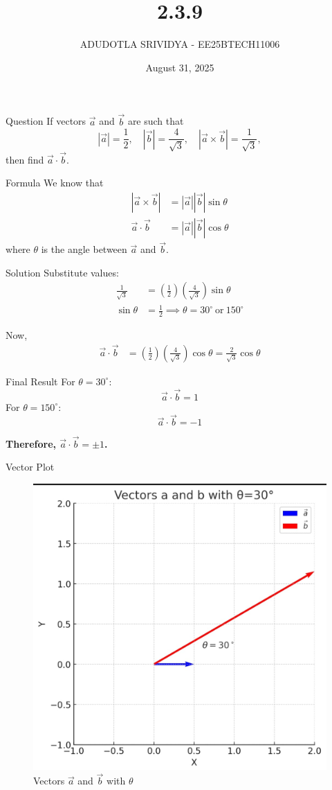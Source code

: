 \documentclass{beamer}
\title
{2.3.9}
\date{August 31, 2025}
\author 
{ADUDOTLA SRIVIDYA - EE25BTECH11006}
\begin{document}
\frame{\titlepage}


\begin{frame}{Question}
If vectors $\vec{a}$ and $\vec{b}$ are such that 
\[
|\vec{a}| = \frac{1}{2}, \quad |\vec{b}| = \frac{4}{\sqrt{3}}, \quad |\vec{a} \times \vec{b}| = \frac{1}{\sqrt{3}},
\]
then find $\vec{a} \cdot \vec{b}$.
\end{frame}


\begin{frame}{Formula}
We know that
\begin{align}
|\vec{a} \times \vec{b}| &= |\vec{a}||\vec{b}|\sin\theta \\
\vec{a} \cdot \vec{b} &= |\vec{a}||\vec{b}|\cos\theta
\end{align}
where $\theta$ is the angle between $\vec{a}$ and $\vec{b}$.
\end{frame}


\begin{frame}{Solution}
Substitute values:
\begin{align}
\frac{1}{\sqrt{3}} &= \left(\frac{1}{2}\right)\left(\frac{4}{\sqrt{3}}\right)\sin\theta \\
\sin\theta &= \frac{1}{2} \implies \theta = 30^\circ \ \text{or}\ 150^\circ
\end{align}

Now,
\begin{align}
\vec{a} \cdot \vec{b} &= \left(\frac{1}{2}\right)\left(\frac{4}{\sqrt{3}}\right)\cos\theta = \frac{2}{\sqrt{3}}\cos\theta
\end{align}
\end{frame}


\begin{frame}{Final Result}
For $\theta = 30^\circ$:
\[
\vec{a} \cdot \vec{b} = 1
\]
For $\theta = 150^\circ$:
\[
\vec{a} \cdot \vec{b} = -1
\]

\centering
\textbf{Therefore, $\vec{a} \cdot \vec{b} = \pm 1$.}
\end{frame}


\begin{frame}{Vector Plot}
\begin{figure}
    \centering
    \includegraphics[width=0.5\columnwidth]{figs/fig2.3.9.jpeg}
    \caption{Vectors $\vec{a}$ and $\vec{b}$ with $\theta$}
    \label{fig:plot}
\end{figure}
\end{frame}
\end{document}

